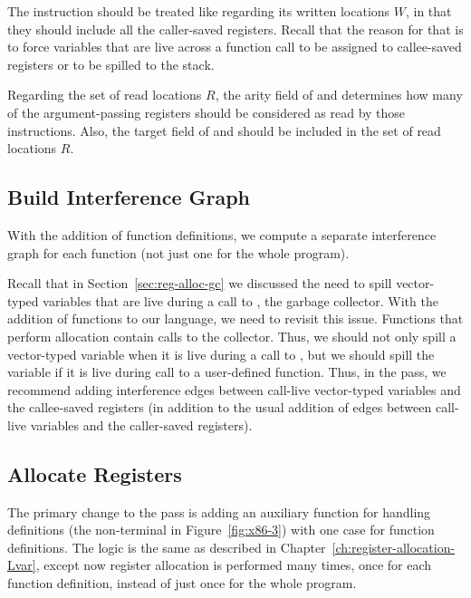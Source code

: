 \documentclass[7x10,nocrop]{TimesAPriori_MIT}%
\begin{document}

The  instruction should be treated like
 regarding its written locations $W$, in that they should
include all the caller-saved registers. Recall that the reason for
that is to force variables that are live across a function call to be assigned to callee-saved
registers or to be spilled to the stack.

Regarding the set of read locations $R$, the arity field of
 and  determines how many of the
argument-passing registers should be considered as read by those
instructions. Also, the target field of  and
 should be included in the set of read locations
$R$.

\subsection{Build Interference Graph}
\label{sec:build-interference-r4}

With the addition of function definitions, we compute a separate interference
graph for each function (not just one for the whole program).

Recall that in Section~\ref{sec:reg-alloc-gc} we discussed the need to
spill vector-typed variables that are live during a call to 
, the garbage collector.  With the addition of functions to our language, we
need to revisit this issue. Functions that perform allocation contain
calls to the collector. Thus, we should 
not only spill a vector-typed variable when it is live during a call
to , but we should spill the variable if it is live
during call to a user-defined function. Thus, in the  pass,
we recommend adding interference edges between call-live vector-typed
variables and the callee-saved registers (in addition to the usual
addition of edges between call-live variables and the caller-saved
registers).


\subsection{Allocate Registers}

The primary change to the  pass is adding an
auxiliary function for handling definitions (the \Def{} non-terminal
in Figure~\ref{fig:x86-3}) with one case for function definitions. The
logic is the same as described in
Chapter~\ref{ch:register-allocation-Lvar}, except now register
allocation is performed many times, once for each function definition,
instead of just once for the whole program.
\end{document}
